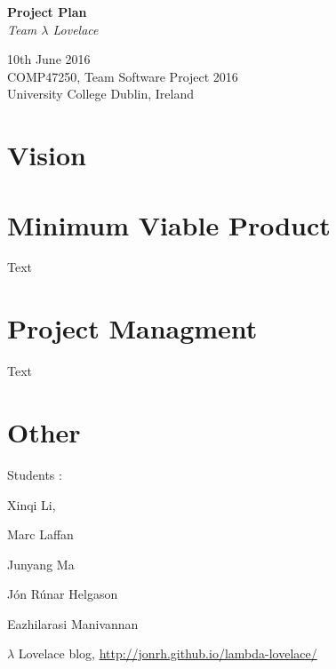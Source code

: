 \documentclass{article}
\begin{document}
\begin{center}
	{\LARGE \textbf{Project Plan}} \\
	\vspace{0.5em}
	\textsl{Team $\lambda$ Lovelace}
\end{center}

\vspace{0.5em}

\begin{center}
	10th June 2016 \\
	COMP47250, Team Software Project 2016 \\ 
	University College Dublin, Ireland \\
\end{center}


\section{Vision}
% 


\section{Minimum Viable Product}
% 

Text


\section{Project Managment}

Text


\section*{Other}
Students :

\begin{itemize*}
	\item Xinqi Li, \url{}
	\item Marc Laffan
	\item Junyang Ma
	\item Jón Rúnar Helgason
	\item Eazhilarasi Manivannan
\end{itemize*}


\begin{thebibliography}{9} 

	$\lambda$ Lovelace blog, \url{http://jonrh.github.io/lambda-lovelace/}

\end{thebibliography}
\end{document}
